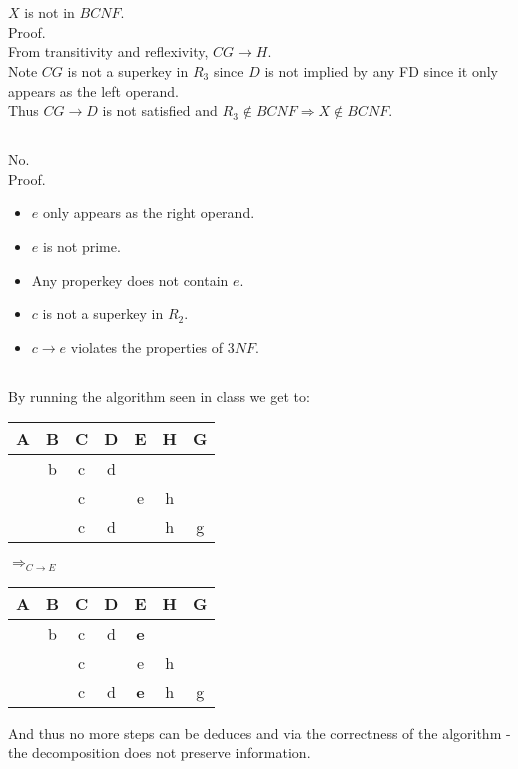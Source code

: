 \section{}
\subsection{}
$X$ is not in $BCNF$.\\
Proof.\\
From transitivity and reflexivity, $CG\rightarrow H$.\\
Note $CG$ is not a superkey in $R_3$ since $D$ is not implied
by any FD since it only appears as the left operand.\\
Thus $CG \rightarrow D$ is not satisfied and $R_3\notin BCNF \Rightarrow X\notin BCNF$.

\subsection{}
No.\\
Proof.
\begin{itemize}
	\item $e$ only appears as the right operand.
	\item $e$ is not prime.
	\item Any properkey does not contain $e$.
	\item $c$ is not a superkey in $R_2$.
	\item $c\rightarrow e$ violates the properties of $3NF$.
\end{itemize}

\subsection{}
By running the algorithm seen in class we get to:
\begin{center}
	\begin{tabular}{| c | c | c | c | c | c | c |}
		\hline
		A	&B	&C	&D	&E	&H	&G	\\
		\hline
			&b	&c	&d	&	&	&	\\
		\hline
			&	&c	&	&e	&h	&	\\
		\hline
			&	&c	&d	&	&h	&g	\\
		\hline
	\end{tabular}
	$\Longrightarrow_{C\rightarrow E}$
	\begin{tabular}{| c | c | c | c | c | c | c |}
		\hline
		A	&B	&C	&D	&E	&H	&G	\\
		\hline
			&b	&c	&d	&\textbf{e}	&	&	\\
		\hline
			&	&c	&	&e	&h	&	\\
		\hline
			&	&c	&d	&\textbf{e}	&h	&g	\\
		\hline
	\end{tabular}
\end{center}
And thus no more steps can be deduces and via the correctness of the algorithm -
the decomposition does not preserve information.

